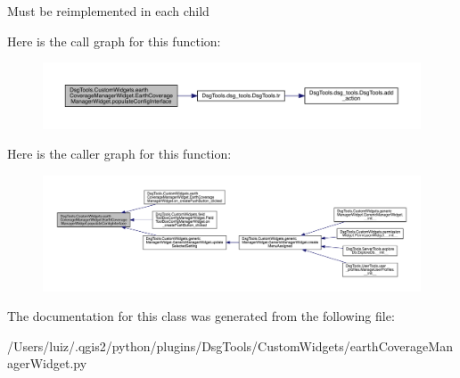 \begin{DoxyVerb}Must be reimplemented in each child
\end{DoxyVerb}
 Here is the call graph for this function\+:
\nopagebreak
\begin{figure}[H]
\begin{center}
\leavevmode
\includegraphics[width=350pt]{class_dsg_tools_1_1_custom_widgets_1_1earth_coverage_manager_widget_1_1_earth_coverage_manager_widget_a64ae0f66203378930f749b2993c4474b_cgraph}
\end{center}
\end{figure}
Here is the caller graph for this function\+:
\nopagebreak
\begin{figure}[H]
\begin{center}
\leavevmode
\includegraphics[width=350pt]{class_dsg_tools_1_1_custom_widgets_1_1earth_coverage_manager_widget_1_1_earth_coverage_manager_widget_a64ae0f66203378930f749b2993c4474b_icgraph}
\end{center}
\end{figure}


The documentation for this class was generated from the following file\+:\begin{DoxyCompactItemize}
\item 
/\+Users/luiz/.\+qgis2/python/plugins/\+Dsg\+Tools/\+Custom\+Widgets/earth\+Coverage\+Manager\+Widget.\+py\end{DoxyCompactItemize}

